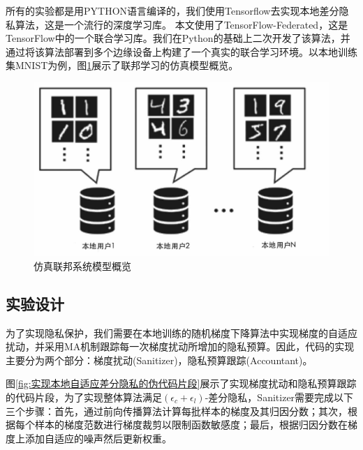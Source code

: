 所有的实验都是用PYTHON语言编译的，我们使用Tensorflow去实现本地差分隐私算法，这是一个流行的深度学习库。 本文使用了TensorFlow-Federated，这是TensorFlow中的一个联合学习库。我们在Python的基础上二次开发了该算法，并通过将该算法部署到多个边缘设备上构建了一个真实的联合学习环境。以本地训练集MNIST为例，图\ref{fig:仿真联邦系统模型概览}展示了联邦学习的仿真模型概览。

\begin{figure}[!hbt]
\centering
	\includegraphics[scale=0.6]{fig2/C3/联邦系统仿真模型概览}%
	\caption{仿真联邦系统模型概览}
	\label{fig:仿真联邦系统模型概览}	
\end{figure}

\subsection{实验设计}
为了实现隐私保护，我们需要在本地训练的随机梯度下降算法中实现梯度的自适应扰动，并采用MA机制跟踪每一次梯度扰动所增加的隐私预算。因此，代码的实现主要分为两个部分：梯度扰动(Sanitizer)，隐私预算跟踪(Accountant)。

图\ref{fig:实现本地自适应差分隐私的伪代码片段}展示了实现梯度扰动和隐私预算跟踪的代码片段，为了实现整体算法满足$\left(\epsilon_{c}+\epsilon_{l}\right)$-差分隐私，Sanitizer需要完成以下三个步骤：首先，通过前向传播算法计算每批样本的梯度及其归因分数；其次，根据每个样本的梯度范数进行梯度裁剪以限制函数敏感度；最后，根据归因分数在梯度上添加自适应的噪声然后更新权重。

